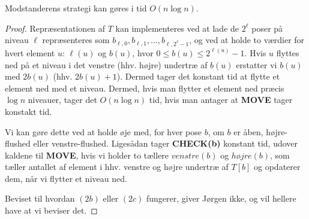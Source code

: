 \begin{corollary}
	Modstanderens strategi kan gøres i tid $O(n \log n)$.
\end{corollary}

\begin{proof}
	Repræsentationen af $T$ kan implementeres ved at lade de $2^{\ell}$ poser på niveau $\ell$ repræsenteres som $b_{\ell,0 }, b_{\ell, 1}, \ldots, b_{\ell, 2^{\ell}-1}$, og ved at holde to værdier for hvert element $u$: $\ell(u)$ og $b(u)$, hvor $0 \le b(u) \le 2^{\ell(u)}-1$. Hvis $u$ flyttes ned på et niveau i det venstre (hhv. højre) undertræ af $b(u)$ erstatter vi $b(u)$ med $2b(u)$ (hhv. $2b(u)+1$). Dermed tager det konstant tid at flytte et element ned med et niveau. Dermed, hvis man flytter et element ned præcis $\log n$ niveauer, tager det $O(n \log n)$ tid, hvis man antager at \textbf{MOVE} tager konstakt tid.

	Vi kan gøre dette ved at holde øje med, for hver pose $b$, om $b$ er åben, højre-flushed eller venstre-flushed. Ligesådan tager \textbf{CHECK(b)} konstant tid, udover kaldene til \textbf{MOVE}, hvis vi holder to tællere $venstre(b)$ og $højre(b)$, som tæller antallet af element i hhv. venstre og højre undertræ af $T[b]$ og opdaterer dem, når vi flytter et niveau ned.

	Beviset til hvordan $(2b)$ eller $(2c)$ fungerer, giver Jørgen ikke, og vil hellere have at vi beviser det.
\end{proof}

